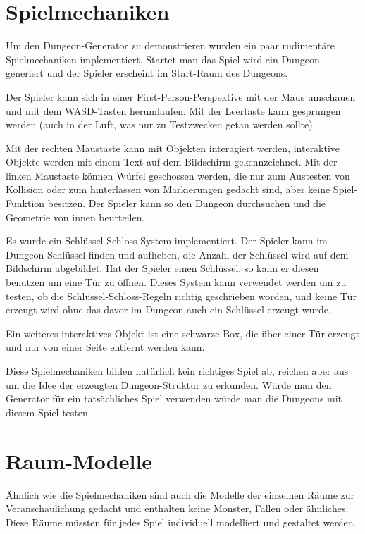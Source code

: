 \section{Spielmechaniken}

Um den Dungeon-Generator zu demonstrieren wurden ein paar rudimentäre Spielmechaniken implementiert. Startet man das Spiel wird ein Dungeon generiert und der Spieler erscheint im Start-Raum des Dungeons.

Der Spieler kann sich in einer First-Person-Perspektive mit der Maus umschauen und mit dem WASD-Tasten herumlaufen. Mit der Leertaste kann gesprungen werden (auch in der Luft, was nur zu Testzwecken getan werden sollte).

Mit der rechten Maustaste kann mit Objekten interagiert werden, interaktive Objekte werden mit einem Text auf dem Bildschirm gekennzeichnet. Mit der linken Maustaste können Würfel geschossen werden, die nur zum Austesten von Kollision oder zum hinterlassen von Markierungen gedacht sind, aber keine Spiel-Funktion besitzen. Der Spieler kann so den Dungeon durchsuchen und die Geometrie von innen beurteilen. 

Es wurde ein Schlüssel-Schloss-System implementiert. Der Spieler kann im Dungeon Schlüssel finden und aufheben, die Anzahl der Schlüssel wird auf dem Bildschirm abgebildet. Hat der Spieler einen Schlüssel, so kann er diesen benutzen um eine Tür zu öffnen. Dieses System kann verwendet werden um zu testen, ob die Schlüssel-Schloss-Regeln richtig geschrieben worden, und keine Tür erzeugt wird ohne das davor im Dungeon auch ein Schlüssel erzeugt wurde.

Ein weiteres interaktives Objekt ist eine schwarze Box, die über einer Tür erzeugt und nur von einer Seite entfernt werden kann. 

Diese Spielmechaniken bilden natürlich kein richtiges Spiel ab, reichen aber aus um die Idee der erzeugten Dungeon-Struktur zu erkunden. Würde man den Generator für ein tatsächliches Spiel verwenden würde man die Dungeons mit diesem Spiel testen.

\section{Raum-Modelle}

Ähnlich wie die Spielmechaniken sind auch die Modelle der einzelnen Räume zur Veranschaulichung gedacht und enthalten keine Monster, Fallen oder ähnliches. Diese Räume müssten für jedes Spiel individuell modelliert und gestaltet werden. 

